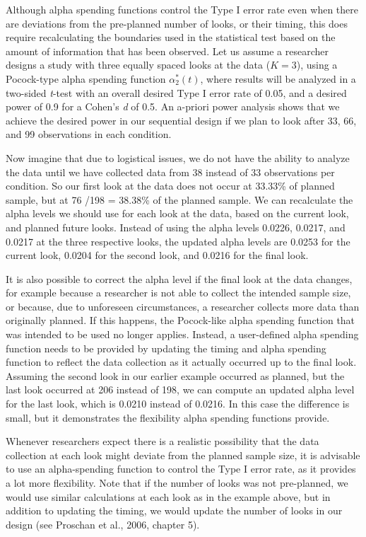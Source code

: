 \documentclass[
  english,
  ,jou, a4paper,floatsintext]{apa6}
\begin{document}
Although alpha spending functions control the Type I error rate even when there are deviations from the pre-planned number of looks, or their timing, this does require recalculating the boundaries used in the statistical test based on the amount of information that has been observed. Let us assume a researcher designs a study with three equally spaced looks at the data (\(K = 3\)), using a Pocock-type alpha spending function \(\alpha_2^*(t)\), where results will be analyzed in a two-sided \emph{t}-test with an overall desired Type I error rate of 0.05, and a desired power of 0.9 for a Cohen's \emph{d} of 0.5. An a-priori power analysis shows that we achieve the desired power in our sequential design if we plan to look after 33, 66, and 99 observations in each condition.

Now imagine that due to logistical issues, we do not have the ability to analyze the data until we have collected data from 38 instead of 33 observations per condition. So our first look at the data does not occur at 33.33\% of planned sample, but at 76 /198 = 38.38\% of the planned sample. We can recalculate the alpha levels we should use for each look at the data, based on the current look, and planned future looks. Instead of using the alpha levels 0.0226, 0.0217, and 0.0217 at the three respective looks, the updated alpha levels are 0.0253 for the current look, 0.0204 for the second look, and 0.0216 for the final look.

It is also possible to correct the alpha level if the final look at the data changes, for example because a researcher is not able to collect the intended sample size, or because, due to unforeseen circumstances, a researcher collects more data than originally planned. If this happens, the Pocock-like alpha spending function that was intended to be used no longer applies. Instead, a user-defined alpha spending function needs to be provided by updating the timing and alpha spending function to reflect the data collection as it actually occurred up to the final look. Assuming the second look in our earlier example occurred as planned, but the last look occurred at 206 instead of 198, we can compute an updated alpha level for the last look, which is 0.0210 instead of 0.0216. In this case the difference is small, but it demonstrates the flexibility alpha spending functions provide.

Whenever researchers expect there is a realistic possibility that the data collection at each look might deviate from the planned sample size, it is advisable to use an alpha-spending function to control the Type I error rate, as it provides a lot more flexibility. Note that if the number of looks was not pre-planned, we would use similar calculations at each look as in the example above, but in addition to updating the timing, we would update the number of looks in our design (see Proschan et al., 2006, chapter 5).
\end{document}
